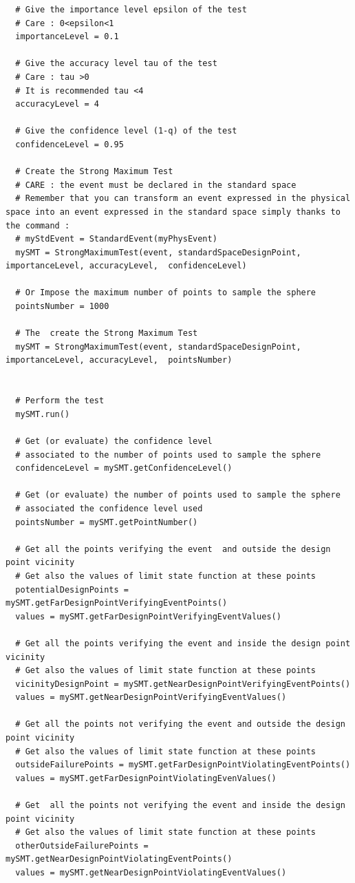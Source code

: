 \begin{lstlisting}
  # Give the importance level epsilon of the test
  # Care : 0<epsilon<1
  importanceLevel = 0.1

  # Give the accuracy level tau of the test
  # Care : tau >0
  # It is recommended tau <4
  accuracyLevel = 4

  # Give the confidence level (1-q) of the test
  confidenceLevel = 0.95

  # Create the Strong Maximum Test
  # CARE : the event must be declared in the standard space
  # Remember that you can transform an event expressed in the physical space into an event expressed in the standard space simply thanks to the command :
  # myStdEvent = StandardEvent(myPhysEvent)
  mySMT = StrongMaximumTest(event, standardSpaceDesignPoint,  importanceLevel, accuracyLevel,  confidenceLevel)

  # Or Impose the maximum number of points to sample the sphere
  pointsNumber = 1000

  # The  create the Strong Maximum Test
  mySMT = StrongMaximumTest(event, standardSpaceDesignPoint,  importanceLevel, accuracyLevel,  pointsNumber)


  # Perform the test
  mySMT.run()

  # Get (or evaluate) the confidence level
  # associated to the number of points used to sample the sphere
  confidenceLevel = mySMT.getConfidenceLevel()

  # Get (or evaluate) the number of points used to sample the sphere
  # associated the confidence level used
  pointsNumber = mySMT.getPointNumber()

  # Get all the points verifying the event  and outside the design point vicinity
  # Get also the values of limit state function at these points
  potentialDesignPoints = mySMT.getFarDesignPointVerifyingEventPoints()
  values = mySMT.getFarDesignPointVerifyingEventValues()

  # Get all the points verifying the event and inside the design point vicinity
  # Get also the values of limit state function at these points
  vicinityDesignPoint = mySMT.getNearDesignPointVerifyingEventPoints()
  values = mySMT.getNearDesignPointVerifyingEventValues()

  # Get all the points not verifying the event and outside the design point vicinity
  # Get also the values of limit state function at these points
  outsideFailurePoints = mySMT.getFarDesignPointViolatingEventPoints()
  values = mySMT.getFarDesignPointViolatingEvenValues()

  # Get  all the points not verifying the event and inside the design point vicinity
  # Get also the values of limit state function at these points
  otherOutsideFailurePoints = mySMT.getNearDesignPointViolatingEventPoints()
  values = mySMT.getNearDesignPointViolatingEventValues()
\end{lstlisting}
